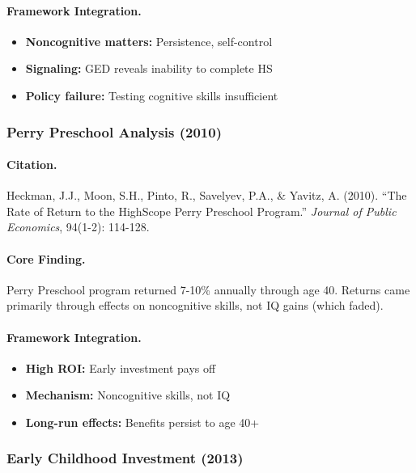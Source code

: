 \paragraph{Framework Integration.}
\begin{itemize}
  \item \textbf{Noncognitive matters:} Persistence, self-control
  \item \textbf{Signaling:} GED reveals inability to complete HS
  \item \textbf{Policy failure:} Testing cognitive skills insufficient
\end{itemize}

\subsubsection{Perry Preschool Analysis (2010)}

\paragraph{Citation.}
Heckman, J.J., Moon, S.H., Pinto, R., Savelyev, P.A., \& Yavitz, A. (2010).
``The Rate of Return to the HighScope Perry Preschool Program.''
\emph{Journal of Public Economics}, 94(1-2): 114-128.

\paragraph{Core Finding.}
Perry Preschool program returned 7-10\% annually through age 40.
Returns came primarily through effects on noncognitive skills,
not IQ gains (which faded).

\paragraph{Framework Integration.}
\begin{itemize}
  \item \textbf{High ROI:} Early investment pays off
  \item \textbf{Mechanism:} Noncognitive skills, not IQ
  \item \textbf{Long-run effects:} Benefits persist to age 40+
\end{itemize}

\subsubsection{Early Childhood Investment (2013)}

